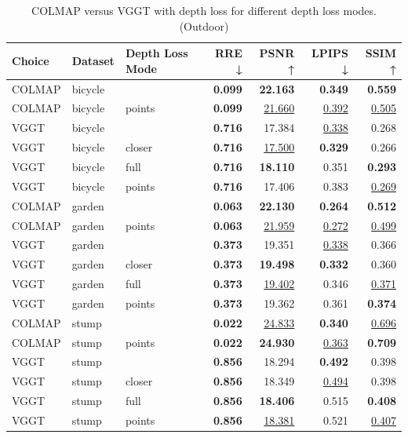 \begin{table}[H]
\caption{\ifdefined\customcaption \customcaption \else COLMAP versus VGGT with depth loss for different depth loss modes. (Outdoor) \fi}
\label{tab:05_depth_loss_mode_outdoor}
\centering
\scriptsize
\begin{tabular}{lllrrrr}
\toprule
Choice & Dataset & Depth Loss Mode & RRE ↓ & PSNR ↑ & LPIPS ↓ & SSIM ↑ \\
\midrule
COLMAP & bicycle &  & \textbf{0.099} & \textbf{22.163} & \textbf{0.349} & \textbf{0.559} \\
COLMAP & bicycle & points & \textbf{0.099} & \underline{21.660} & \underline{0.392} & \underline{0.505} \\
\midrule
VGGT & bicycle &  & \textbf{0.716} & 17.384 & \underline{0.338} & 0.268 \\
VGGT & bicycle & closer & \textbf{0.716} & \underline{17.500} & \textbf{0.329} & 0.266 \\
VGGT & bicycle & full & \textbf{0.716} & \textbf{18.110} & 0.351 & \textbf{0.293} \\
VGGT & bicycle & points & \textbf{0.716} & 17.406 & 0.383 & \underline{0.269} \\
\midrule
COLMAP & garden &  & \textbf{0.063} & \textbf{22.130} & \textbf{0.264} & \textbf{0.512} \\
COLMAP & garden & points & \textbf{0.063} & \underline{21.959} & \underline{0.272} & \underline{0.499} \\
\midrule
VGGT & garden &  & \textbf{0.373} & 19.351 & \underline{0.338} & 0.366 \\
VGGT & garden & closer & \textbf{0.373} & \textbf{19.498} & \textbf{0.332} & 0.360 \\
VGGT & garden & full & \textbf{0.373} & \underline{19.402} & 0.346 & \underline{0.371} \\
VGGT & garden & points & \textbf{0.373} & 19.362 & 0.361 & \textbf{0.374} \\
\midrule
COLMAP & stump &  & \textbf{0.022} & \underline{24.833} & \textbf{0.340} & \underline{0.696} \\
COLMAP & stump & points & \textbf{0.022} & \textbf{24.930} & \underline{0.363} & \textbf{0.709} \\
\midrule
VGGT & stump &  & \textbf{0.856} & 18.294 & \textbf{0.492} & 0.398 \\
VGGT & stump & closer & \textbf{0.856} & 18.349 & \underline{0.494} & 0.398 \\
VGGT & stump & full & \textbf{0.856} & \textbf{18.406} & 0.515 & \textbf{0.408} \\
VGGT & stump & points & \textbf{0.856} & \underline{18.381} & 0.521 & \underline{0.407} \\
\bottomrule
\end{tabular}
\end{table}